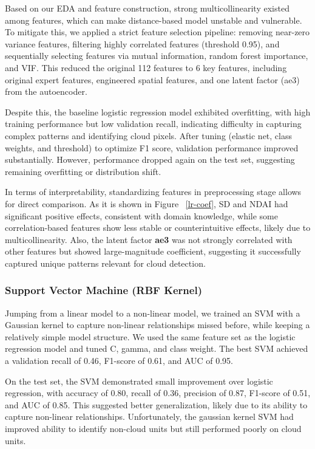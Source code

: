 \documentclass[10pt,letterpaper]{article}
\begin{document}
Based on our EDA and feature construction, strong multicollinearity existed among features, which can make distance-based model unstable and vulnerable. To mitigate this, we applied a strict feature selection pipeline: removing near-zero variance features, filtering highly correlated features (threshold 0.95), and sequentially selecting features via mutual information, random forest importance, and VIF. This reduced the original 112 features to 6 key features, including original expert features, engineered spatial features, and one latent factor (ae3) from the autoencoder.

Despite this, the baseline logistic regression model exhibited overfitting, with high training performance but low validation recall, indicating difficulty in capturing complex patterns and identifying cloud pixels. After tuning (elastic net, class weights, and threshold) to optimize F1 score, validation performance improved substantially. However, performance dropped again on the test set, suggesting remaining overfitting or distribution shift.

In terms of interpretability, standardizing features in preprocessing stage allows for direct comparison. As it is shown in Figure ~\ref{lr-coef}, SD and NDAI had significant positive effects, consistent with domain knowledge, while some correlation-based features show less stable or counterintuitive effects, likely due to multicollinearity. Also, the latent factor \textbf{ae3} was not strongly correlated with other features but showed large-magnitude coefficient, suggesting it successfully captured unique patterns relevant for cloud detection.

\subsubsection{Support Vector Machine (RBF Kernel)}


Jumping from a linear model to a non-linear model, we trained an SVM with a Gaussian kernel to capture non-linear relationships missed before, while keeping a relatively simple model structure. We used the same feature set as the logistic regression model and tuned C, gamma, and class weight. The best SVM achieved a validation recall of 0.46, F1-score of 0.61, and AUC of 0.95. 

On the test set, the SVM demonstrated small improvement over logistic regression, with accuracy of 0.80, recall of 0.36, precision of 0.87, F1-score of 0.51, and AUC of 0.85. This suggested better generalization, likely due to its ability to capture non-linear relationships. Unfortunately, the gaussian kernel SVM had improved ability to identify non-cloud units but still performed poorly on cloud units.
\end{document}
